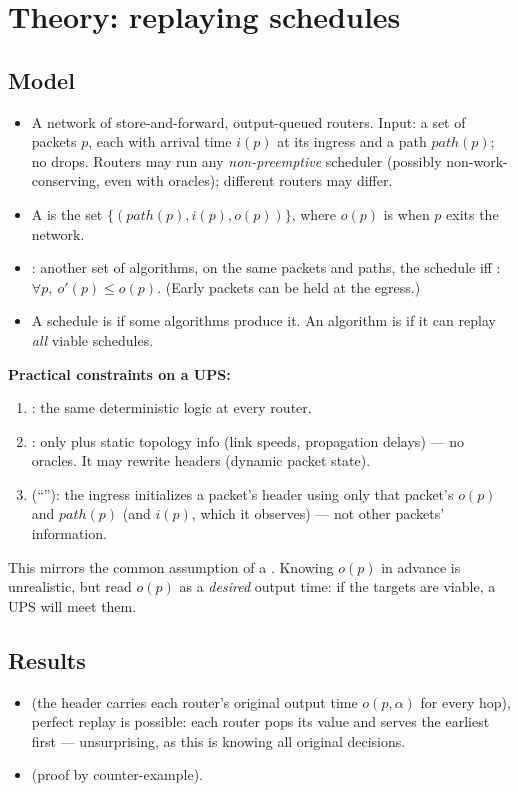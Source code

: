 \section{Theory: replaying schedules}
\subsection{Model}
\begin{itemize}
\item A network of store-and-forward, output-queued routers. Input: a set of packets $p$, each with arrival time $i(p)$ at its ingress and a path $path(p)$; no drops. Routers may run any \emph{non-preemptive} scheduler (possibly non-work-conserving, even with oracles); different routers may differ.
\item A  is the set $\{(path(p), i(p), o(p))\}$, where $o(p)$ is when $p$ exits the network.
\item {}: another set of algorithms, on the same packets and paths,  the schedule iff : $\forall p,\ o'(p) \le o(p)$. (Early packets can be held at the egress.)
\item A schedule is  if some algorithms produce it. An algorithm is  if it can replay \emph{all} viable schedules.
\end{itemize}
\textbf{Practical constraints on a UPS:}
\begin{enumerate}
\item {}: the same deterministic logic at every router.
\item {}: only  plus static topology info (link speeds, propagation delays) --- no oracles. It may rewrite headers (dynamic packet state).
\item {} (``''): the ingress initializes a packet's header using only that packet's $o(p)$ and $path(p)$ (and $i(p)$, which it observes) --- not other packets' information.
\end{enumerate}
This mirrors the common assumption of a . Knowing $o(p)$ in advance is unrealistic, but read $o(p)$ as a \emph{desired} output time: if the targets are viable, a UPS will meet them.

\subsection{Results}
\begin{itemize}
\item {} (the header carries each router's original output time $o(p,\alpha)$ for every hop), perfect replay is possible: each router pops its value and serves the earliest first --- unsurprising, as this is knowing all original decisions.
\item {} (proof by counter-example).
\end{itemize}

